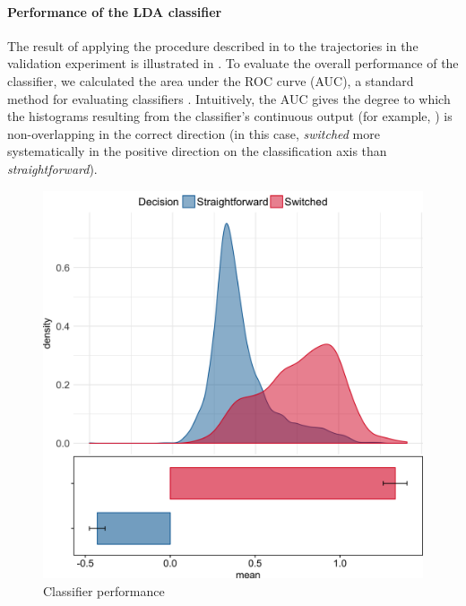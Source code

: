 \documentclass{article}
\begin{document}
\paragraph{Performance of the LDA classifier}
The result of applying the procedure described in  to the trajectories in the validation experiment is illustrated in . 
To evaluate the overall performance of the classifier, we calculated the area under the ROC curve (AUC), a standard method for evaluating classifiers \citep{Hastie}. Intuitively, the AUC gives the degree to which the histograms resulting from the classifier's continuous output (for example, ) is non-overlapping in the correct direction (in this case, \textit{switched} more systematically in the positive direction on the classification axis than \textit{straightforward}). 


\begin{figure}
\centering
\includegraphics[width=\textwidth]{lda_distribution_calibration.png}
\caption{Classifier performance} \label{DIST:LDA}
\end{figure}
\end{document}
